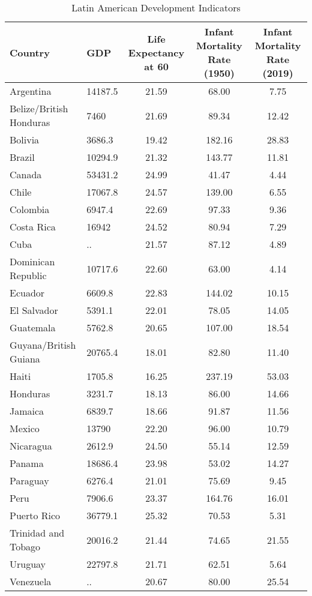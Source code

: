 \documentclass[
]{article}
\begin{document}
\begin{landscape} 


\begin{table}[ht]
\centering
\caption{Latin American Development Indicators} 
\begin{tabular}{l|p{2cm}ccc}
Country & GDP & Life Expectancy at 60 & Infant Mortality Rate (1950) & Infant Mortality Rate (2019) \\ 
  \hline
Argentina & 14187.5 & 21.59 & 68.00 & 7.75 \\ 
  Belize/British Honduras & 7460 & 21.69 & 89.34 & 12.42 \\ 
  Bolivia & 3686.3 & 19.42 & 182.16 & 28.83 \\ 
  Brazil & 10294.9 & 21.32 & 143.77 & 11.81 \\ 
  Canada & 53431.2 & 24.99 & 41.47 & 4.44 \\ 
  Chile & 17067.8 & 24.57 & 139.00 & 6.55 \\ 
  Colombia & 6947.4 & 22.69 & 97.33 & 9.36 \\ 
  Costa Rica & 16942 & 24.52 & 80.94 & 7.29 \\ 
  Cuba & .. & 21.57 & 87.12 & 4.89 \\ 
  Dominican Republic & 10717.6 & 22.60 & 63.00 & 4.14 \\ 
  Ecuador & 6609.8 & 22.83 & 144.02 & 10.15 \\ 
  El Salvador & 5391.1 & 22.01 & 78.05 & 14.05 \\ 
  Guatemala & 5762.8 & 20.65 & 107.00 & 18.54 \\ 
  Guyana/British Guiana & 20765.4 & 18.01 & 82.80 & 11.40 \\ 
  Haiti & 1705.8 & 16.25 & 237.19 & 53.03 \\ 
  Honduras & 3231.7 & 18.13 & 86.00 & 14.66 \\ 
  Jamaica & 6839.7 & 18.66 & 91.87 & 11.56 \\ 
  Mexico & 13790 & 22.20 & 96.00 & 10.79 \\ 
  Nicaragua & 2612.9 & 24.50 & 55.14 & 12.59 \\ 
  Panama & 18686.4 & 23.98 & 53.02 & 14.27 \\ 
  Paraguay & 6276.4 & 21.01 & 75.69 & 9.45 \\ 
  Peru & 7906.6 & 23.37 & 164.76 & 16.01 \\ 
  Puerto Rico & 36779.1 & 25.32 & 70.53 & 5.31 \\ 
  Trinidad and Tobago & 20016.2 & 21.44 & 74.65 & 21.55 \\ 
  Uruguay & 22797.8 & 21.71 & 62.51 & 5.64 \\ 
  Venezuela & .. & 20.67 & 80.00 & 25.54 \\ 
\end{tabular}
\end{table}


\end{landscape}
\end{document}
